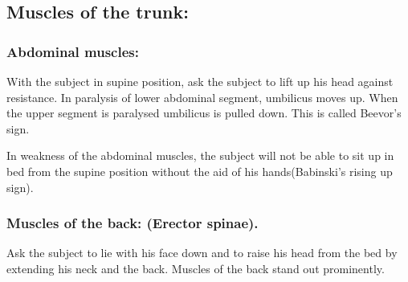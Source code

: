 \documentclass[a4paper,12pt,openany,twoside]{book}
\begin{document}
\subsection*{Muscles	of	the	trunk:}	

\subsubsection*{Abdominal muscles:}
	With the subject in supine position, ask the subject to lift up his head against resistance. In paralysis of lower abdominal segment, umbilicus moves up. When the upper segment is paralysed umbilicus is pulled down. This is called Beevor's sign.
	\par
	In weakness of the abdominal muscles, the subject will not be able to sit up in bed from the supine position without the aid of his hands(Babinski’s rising up sign).
	\subsubsection*{Muscles of the back: (Erector spinae).}
	Ask the subject to lie with his face down and to raise his head from the bed by extending his neck and the back. Muscles of the back stand out prominently.
\end{document}
